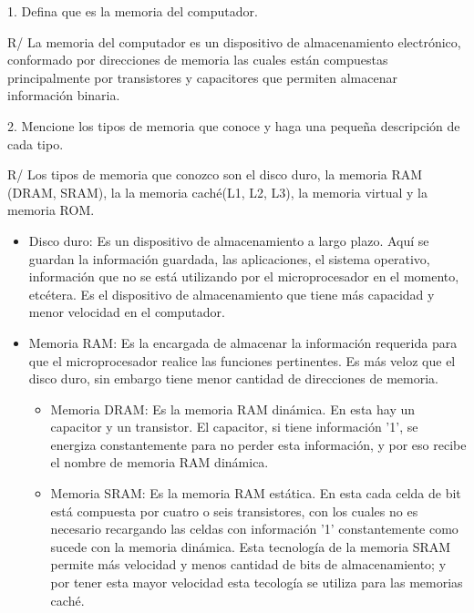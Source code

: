 \documentclass{article}
\begin{document}
1. Defina que es la memoria del computador.

R/ La memoria del computador es un dispositivo de almacenamiento electrónico, conformado por direcciones de memoria las cuales están compuestas principalmente por transistores y capacitores que permiten almacenar información binaria.

\vspace{0.5cm}
2. Mencione los tipos de memoria que conoce y haga una pequeña descripción de cada tipo.

R/ Los tipos de memoria que conozco son el disco duro, la memoria RAM (DRAM, SRAM), la la memoria caché(L1, L2, L3), la memoria virtual y la memoria ROM.


\begin{itemize}


    \item Disco duro:
    Es un dispositivo de almacenamiento a largo plazo. Aquí se guardan la información guardada, las aplicaciones, el sistema operativo, información que no se está utilizando por el microprocesador en el momento, etcétera. Es el dispositivo de almacenamiento que tiene más capacidad y menor velocidad en el computador.
    
    
    \item Memoria RAM:
    Es la encargada de almacenar la información requerida para que el microprocesador realice las funciones pertinentes. Es más veloz que el disco duro, sin embargo tiene menor cantidad de direcciones de memoria.
    \begin{itemize}
        \item Memoria DRAM:
        Es la memoria RAM dinámica. En esta hay un capacitor y un transistor. El capacitor, si tiene información '1', se energiza constantemente para no perder esta información, y por eso recibe el nombre de memoria RAM dinámica.
        \item Memoria SRAM:
        Es la memoria RAM estática. En esta cada celda de bit está compuesta por cuatro o seis transistores, con los cuales no es necesario recargando las celdas con información '1' constantemente como sucede con la memoria dinámica. Esta tecnología de la memoria SRAM permite más velocidad y menos cantidad de bits de almacenamiento; y por tener esta mayor velocidad esta tecología se utiliza para las memorias caché.
    \end{itemize}



\end{itemize}
\end{document}
